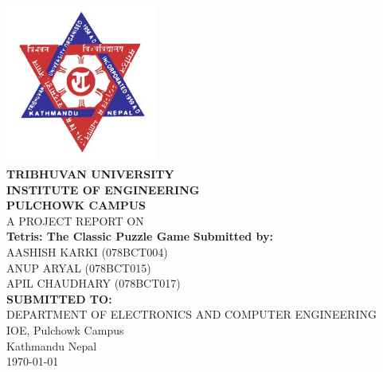 
\begin{titlepage}
	
	\newcommand{\HRule}{\rule{\linewidth}{0.3mm}}
	\centering
	\vfill
	\includegraphics[width=50mm]{images/tu.jpg}\\[0.75cm]
	\textsc{\Large \bfseries  TRIBHUVAN UNIVERSITY}\\[0.25cm] %
	\textsc{\Large \bfseries INSTITUTE OF ENGINEERING}\\[0.25cm]
	\textsc{\Large \bfseries  PULCHOWK CAMPUS}\\
	\vfill
	\large {A PROJECT REPORT ON }\\
	\Large \textbf{Tetris: The Classic Puzzle Game}
	\vfill
	\large
		\textbf{Submitted by:}\\
	AASHISH KARKI (078BCT004)\\
	ANUP ARYAL (078BCT015)\\
	APIL CHAUDHARY (078BCT017)\\[0.5cm]
	\vfill
		\textbf{SUBMITTED TO:}\\
	DEPARTMENT OF ELECTRONICS AND COMPUTER ENGINEERING\\
	IOE, Pulchowk Campus\\
	Kathmandu Nepal
	\\
	\vfill
	{\large \today}
	\vfill
\end{titlepage}

